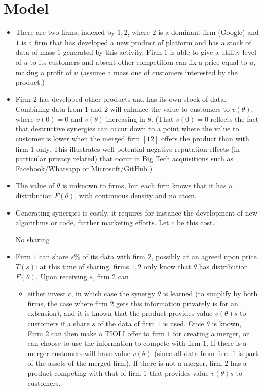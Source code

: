 \documentclass[a4paper,leqno]{article}%
\renewcommand{\t}{\theta}
\begin{document}
\section{Model}
\begin{itemize}
    \item There are two firms, indexed by $1,2$, where $2$ is a dominant firm (Google) and $1$ is a firm that has developed a new product of platform and has a stock of data of mass $1$ generated by this activity. Firm $1$ is able to give a utility level of $u$ to its customers and absent other competition can fix a price equal to $u$, making a profit of $u$ (assume a mass one of customers interested by the product.)
    \item Firm $2$ has developed other products and has its own stock of data. Combining data from $1$ and $2$ will enhance the value to customers to $v(\t)$, where $v(0)=0$ and $v(\t)$ increasing in $\t$. (That $v(0)=0$ reflects the fact that destructive synergies can occur down to a point where the value to customer is lower when the merged firm $[12]$ offers the product than with firm $1$ only. This illustrates well potential negative reputation effects (in particular privacy related) that occur in Big Tech acquisitions such as Facebook/Whatsapp or Microsoft/GitHub.)
    \item The value of $\t$ is unknown to firms, but each firm knows that it has a distribution $F(\t)$, with continuous density and no atom.
    \item Generating synergies is costly, it requires for instance the development of new algorithms or code, further marketing efforts. Let $c$ be this cost. 
    \item [No sharing]
    \item Firm $1$ can share $s\%$ of its data with firm $2$, possibly at an agreed upon price $T(s)$: at this time of sharing, firms $1,2$ only know that $\t$ has distribution $F(\t)$. Upon receiving $s$, firm $2$ can 
    \begin{itemize}
        \item either invest $c$, in which case the synergy $\t$ is learned (to simplify by both firms, the case where firm $2$ gets this information privately is for an extension), and it is known that the product provides value $v(\t)s$ to customers if a share $s$ of the data of firm $1$ is used. Once $\t$ is known, Firm 2 can then make a TIOLI offer to firm $1$ for creating a merger, or can choose to use the information to compete with firm $1$. If there is a merger customers will have value $v(\t)$ (since all data from firm $1$ is part of the assets of the merged firm). If there is not a merger, firm $2$ has a product competing with that of firm $1$ that provides value $v(\t)s$ to customers.

\end{itemize}
\end{itemize}
\end{document}
